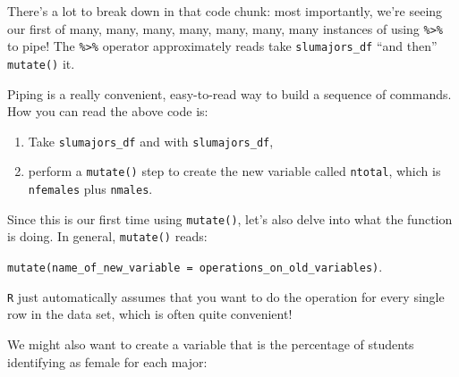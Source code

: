 \documentclass[
]{book}
\begin{document}
There's a lot to break down in that code chunk: most importantly, we're seeing our first of many, many, many, many, many, many, many instances of using \texttt{\%\textgreater{}\%} to pipe! The \texttt{\%\textgreater{}\%} operator approximately reads take \texttt{slumajors\_df} ``and then'' \texttt{mutate()} it.

Piping is a really convenient, easy-to-read way to build a sequence of commands. How you can read the above code is:

\begin{enumerate}
\def\labelenumi{\arabic{enumi}.}
\item
  Take \texttt{slumajors\_df} and with \texttt{slumajors\_df},
\item
  perform a \texttt{mutate()} step to create the new variable called \texttt{ntotal}, which is \texttt{nfemales} plus \texttt{nmales}.
\end{enumerate}

Since this is our first time using \texttt{mutate()}, let's also delve into what the function is doing. In general, \texttt{mutate()} reads:

\texttt{mutate(name\_of\_new\_variable\ =\ operations\_on\_old\_variables)}.

\texttt{R} just automatically assumes that you want to do the operation for every single row in the data set, which is often quite convenient!

We might also want to create a variable that is the percentage of students identifying as female for each major:
\end{document}
